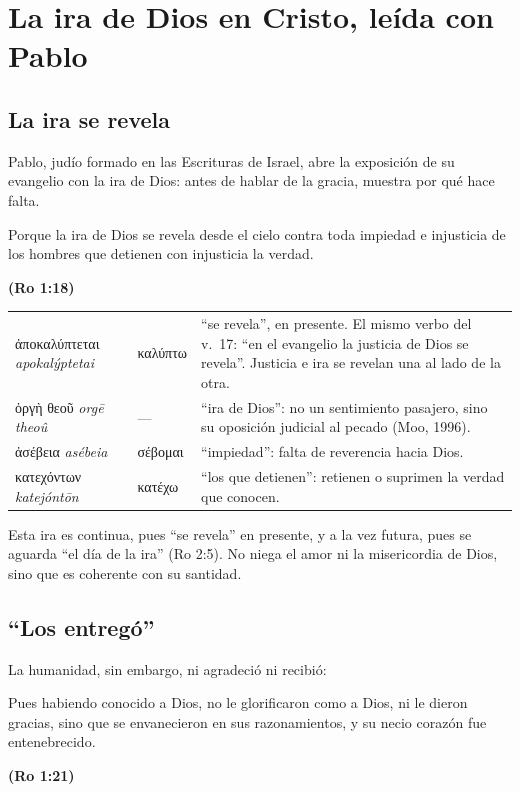 \documentclass[11pt,letterpaper]{article}
\newcommand{\grc}[1]{\foreignlanguage{ancientgreek}{#1}}
\newcommand{\fuente}[1]{\par\hfill{\upshape\bfseries\small\textcolor{azul}{#1}}}
\begin{document}
\section{La ira de Dios en Cristo, leída con Pablo}

\subsection{La ira se revela}
Pablo, judío formado en las Escrituras de Israel, abre la exposición de su evangelio con la ira de Dios: antes de hablar de la gracia, muestra por qué hace falta.

\begin{cita}Porque la ira de Dios se revela desde el cielo contra toda impiedad e injusticia de los hombres que detienen con injusticia la verdad.\fuente{(Ro 1:18)}\end{cita}

\begin{filologia}[Ro 1:17--18]
\begin{tabular}{@{}L{3.2cm}L{1.6cm}L{10cm}@{}}
\grc{ἀποκαλύπτεται} \emph{apokalýptetai} & \grc{καλύπτω} & ``se revela'', en presente. El mismo verbo del v.~17: ``en el evangelio la justicia de Dios se revela''. Justicia e ira se revelan una al lado de la otra. \\[2pt]
\grc{ὀργὴ θεοῦ} \emph{orgē theoû} & --- & ``ira de Dios'': no un sentimiento pasajero, sino su oposición judicial al pecado (Moo, 1996). \\[2pt]
\grc{ἀσέβεια} \emph{asébeia} & \grc{σέβομαι} & ``impiedad'': falta de reverencia hacia Dios. \\[2pt]
\grc{κατεχόντων} \emph{katejóntōn} & \grc{κατέχω} & ``los que detienen'': retienen o suprimen la verdad que conocen. \\
\end{tabular}
\end{filologia}

Esta ira es continua, pues ``se revela'' en presente, y a la vez futura, pues se aguarda ``el día de la ira'' (Ro 2:5). No niega el amor ni la misericordia de Dios, sino que es coherente con su santidad.

\subsection{``Los entregó''}
La humanidad, sin embargo, ni agradeció ni recibió:

\begin{cita}Pues habiendo conocido a Dios, no le glorificaron como a Dios, ni le dieron gracias, sino que se envanecieron en sus razonamientos, y su necio corazón fue entenebrecido.\fuente{(Ro 1:21)}\end{cita}
\end{document}
